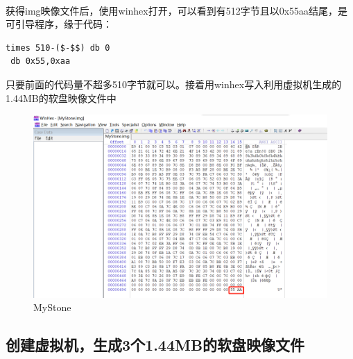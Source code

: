 \documentclass[12pt]{article}
\begin{document}
	\paragraph{}获得img映像文件后，使用winhex打开，可以看到有512字节且以0x55aa结尾，是可引导程序，缘于代码：
	\begin{lstlisting}
times 510-($-$$) db 0
 db 0x55,0xaa	
	\end{lstlisting}
只要前面的代码量不超多510字节就可以。接着用winhex写入利用虚拟机生成的1.44MB的软盘映像文件中

	\begin{figure}[H]
			\centering
			\includegraphics[width=14cm]{./figures/55aa.png}
			\caption{MyStone} 
		\end{figure}	


	\subsection{\Large 创建虚拟机，生成3个1.44MB的软盘映像文件}
\end{document}

